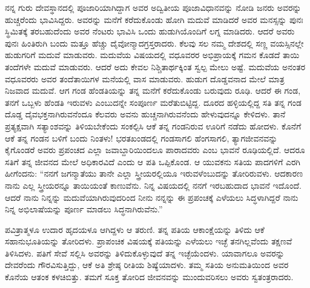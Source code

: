 ನನ್ನ ಗುರು ದೇವಸ್ಥಾನದಲ್ಲಿ ಪೂಜಾರಿಯಾಗಿದ್ದಾಗ ಅವರ ಅದ್ವಿತೀಯ ಪೂಜಾವಿಧಾನವನ್ನು ನೋಡಿ ಜನರು ಅವರನ್ನು ಹುಚ್ಚರೆಂದು ಭಾವಿಸಿದ್ದರು. ಅವರನ್ನು ಮನೆಗೆ ಕರೆದುಕೊಂಡು ಹೋಗಿ ಮದುವೆ ಮಾಡಿದರೆ ಅವರ ಮನಸ್ಸನ್ನು ಪುನಃ ಸ್ಥಿಮಿತಕ್ಕೆ ತರಬಹುದೆಂದು ಅವರ ನೆಂಟರು ಭಾವಿಸಿ ಒಂದು ಹುಡುಗಿಯೊಂದಿಗೆ ಲಗ್ನ ಮಾಡಿದರು. ಆದರೆ ಅವರು ಪುನಃ ಹಿಂತಿರುಗಿ ಬಂದು ಮತ್ತೂ ಹೆಚ್ಚು ದೈವೋನ್ಮಾದಗ್ರಸ್ತರಾದರು. ಕೆಲವು ಸಲ ನಮ್ಮ ದೇಶದಲ್ಲಿ ಸಣ್ಣ ವಯಸ್ಸಿನಲ್ಲೇ ಹುಡುಗರಿಗೆ ಮದುವೆ ಮಾಡುವರು. ಮದುವೆಯ ವಿಷಯದಲ್ಲಿ ವಧೂವರರ ಅಭಿಪ್ರಾಯಕ್ಕೆ ಗಮನ ಕೊಡದೆ ತಾಯಿ ತಂದೆಗಳೇ ಮದುವೆ ಮಾಡುವರು. ಆದರೆ ಅದು ಕೇವಲ ನಿಶ್ಚಿತಾರ್ಥಕ್ಕಿಂತ ಸ್ವಲ್ಪ ಮೇಲು ಅಷ್ಟೆ. ಮದುವೆಯ ಅನಂತರ ವಧೂವರರು ಅವರ ತಂದೆತಾಯಿಗಳ ಮನೆಯಲ್ಲಿ ವಾಸ ಮಾಡುವರು. ಹುಡುಗ ದೊಡ್ಡವನಾದ ಮೇಲೆ ಮಾತ್ರ ನಿಜವಾದ ಮದುವೆ. ಆಗ ಗಂಡ ಹೆಂಡತಿಯನ್ನು ತನ್ನ ಮನೆಗೆ ಕರೆದುಕೊಂಡು ಬರುವುದು ರೂಢಿ. ಆದರೆ ಈ ಗಂಡ, ತನಗೆ ಒಬ್ಬಳು ಹೆಂಡತಿ ಇರುವಳು ಎಂಬುದನ್ನೇ ಸಂಪೂರ್ಣ ಮರೆತುಬಿಟ್ಟಿದ್ದ. ದೂರದ ಹಳ್ಳಿಯಲ್ಲಿದ್ದ ಸತಿ ತನ್ನ ಗಂಡ ದೊಡ್ಡ ದೈವಭಕ್ತನಾಗಿರುವನೆಂದೂ ಕೆಲವರು ಅವನು ಹುಚ್ಚನಾಗಿರುವನೆಂದು ಹೇಳುವುದನ್ನೂ ಕೇಳಿದಳು. ತಾನೆ ಪ್ರತ್ಯಕ್ಷವಾಗಿ ಸತ್ಯಾಂಶವನ್ನು ತಿಳಿಯಬೇಕೆಂದು ಸಂಕಲ್ಪಿಸಿ ಆಕೆ ತನ್ನ ಗಂಡನಿರುವ ಊರಿಗೆ ನಡೆದು ಹೋದಳು. ಕೊನೆಗೆ ಆಕೆ ತನ್ನ ಗಂಡನ ಬಳಿಗೆ ಬಂದು ನಿಂತಳು! ಭರತಖಂಡದಲ್ಲಿ ಗಂಡಸಾಗಲಿ ಹೆಂಗಸಾಗಲಿ, ತ್ಯಾಗಜೀವನವನ್ನು ಕೈಗೊಂಡರೆ ಅವರು ಪ್ರಪಂಚದ ಎಲ್ಲಾ ಜವಾಬ್ದಾರಿಯಿಂದಲೂ ಪಾರಾದವರು ಎಂಬ ಭಾವನೆ ರೂಢಿಯಲ್ಲಿದೆ. ಆದರೂ ಸತಿಗೆ ತನ್ನ ಜೀವನದ ಮೇಲೆ ಅಧಿಕಾರವಿದೆ ಎಂದು ಆ ಪತಿ ಒಪ್ಪಿಕೊಂಡ. ಆ ಯುವಕನು ಸತಿಯ ಪಾದಗಳಿಗೆ ಎರಗಿ ಹೀಗೆಂದನು: “ನನಗೆ ಜಗನ್ಮಾತೆಯು ತಾನೇ ಎಲ್ಲಾ ಸ್ತ್ರೀಯರಲ್ಲಿಯೂ ಇರುವಳೆಂಬುದನ್ನು ತೋರಿರುವಳು. ಆದಕಾರಣ ನಾನು ಎಲ್ಲ ಸ್ತ್ರೀಯರನ್ನೂ ತಾಯಿಯಂತೆ ಕಾಣುವೆನು. ನಿನ್ನ ವಿಷಯದಲ್ಲಿ ನನಗೆ ಇರಬಹುದಾದ ಭಾವನೆ ಇದೊಂದೆ. ಆದರೆ ನಾನು ನಿನ್ನನ್ನು ಮದುವೆಯಾಗಿರುವುದರಿಂದ ನೀನು ನನ್ನನ್ನು ಈ ಪ್ರಪಂಚಕ್ಕೆ ಎಳೆಯಲು ಸಿದ್ಧಳಾಗಿದ್ದರೆ ನಾನು ನಿನ್ನ ಅಭಿಲಾಷೆಯನ್ನು ಪೂರ್ಣ ಮಾಡಲು ಸಿದ್ಧನಾಗಿರುವೆನು.”

ಪವಿತ್ರಾತ್ಮಳೂ ಉದಾರ ಹೃದಯಳೂ ಆಗಿದ್ದಳು ಆ ತರುಣಿ. ತನ್ನ ಪತಿಯ ಆಕಾಂಕ್ಷೆಯನ್ನು ತಿಳಿದು ಆಕೆ ಸಹಾನುಭೂತಿಯನ್ನು ತೋರಿದಳು. ಪ್ರಾಪಂಚಿಕ ವಿಷಯಕ್ಕೆ ಪತಿಯನ್ನು ಎಳೆಯಲು ಇಚ್ಛೆ ತನಗಿಲ್ಲವೆಂದು ತಕ್ಷಣವೆ ತಿಳಿಸಿದಳು. ಪತಿಗೆ ಸೇವೆ ಸಲ್ಲಿಸಿ ಅವರನ್ನು ತಿಳಿದುಕೊಳ್ಳುವುದೆ ತನ್ನ ಇಚ್ಛೆಯೆಂದಳು. ಯಾವಾಗಲೂ ಅವರನ್ನು ದೇವರೆಂದು ಗೌರವಿಸುತ್ತಿದ್ದು, ಆಕೆ ಅತಿ ಶ್ರೇಷ್ಠ ರೀತಿಯ ಶಿಷ್ಯೆಯಾದಳು. ತಮ್ಮ ಸತಿಯ ಅನುಮತಿಯಿಂದ ಅವರ ಕೊನೆಯ ಆತಂಕ ಕಳಚಿಬಿತ್ತು. ತಮಗೆ ಸೂಕ್ತ ತೋರಿದ ಜೀವನವನ್ನು ಮುಂದುವರಿಸಲು ಅವರು ಸ್ವತಂತ್ರರಾದರು.

